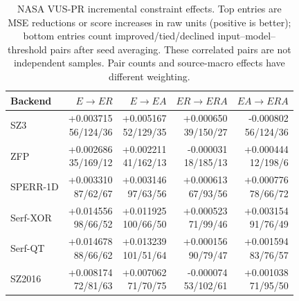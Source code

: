 \begin{table}[t]
\centering
\small
\setlength{\tabcolsep}{5pt}
\caption{NASA VUS-PR incremental constraint effects. Top entries are MSE reductions or score increases in raw units (positive is better); bottom entries count improved/tied/declined input--model--threshold pairs after seed averaging. These correlated pairs are not independent samples. Pair counts and source-macro effects have different weighting.}
\label{tab:s-ablation-contrast-anomaly-VUS-PR}
\begin{tabular}{@{}lrrrr@{}}
\toprule
Backend & $E\to ER$ & $E\to EA$ & $ER\to ERA$ & $EA\to ERA$ \\
\midrule
SZ3 & \shortstack[r]{+0.003715\\56/124/36} & \shortstack[r]{+0.005167\\52/129/35} & \shortstack[r]{+0.000650\\39/150/27} & \shortstack[r]{-0.000802\\56/124/36} \\
ZFP & \shortstack[r]{+0.002686\\35/169/12} & \shortstack[r]{+0.002211\\41/162/13} & \shortstack[r]{-0.000031\\18/185/13} & \shortstack[r]{+0.000444\\12/198/6} \\
SPERR-1D & \shortstack[r]{+0.003310\\87/62/67} & \shortstack[r]{+0.003146\\97/63/56} & \shortstack[r]{+0.000613\\67/93/56} & \shortstack[r]{+0.000776\\78/66/72} \\
Serf-XOR & \shortstack[r]{+0.014556\\98/66/52} & \shortstack[r]{+0.011925\\100/66/50} & \shortstack[r]{+0.000523\\71/99/46} & \shortstack[r]{+0.003154\\91/76/49} \\
Serf-QT & \shortstack[r]{+0.014678\\88/66/62} & \shortstack[r]{+0.013239\\101/51/64} & \shortstack[r]{+0.000156\\90/79/47} & \shortstack[r]{+0.001594\\83/76/57} \\
SZ2016 & \shortstack[r]{+0.008174\\72/81/63} & \shortstack[r]{+0.007062\\71/70/75} & \shortstack[r]{-0.000074\\53/102/61} & \shortstack[r]{+0.001038\\71/95/50} \\
\bottomrule
\end{tabular}
\end{table}

